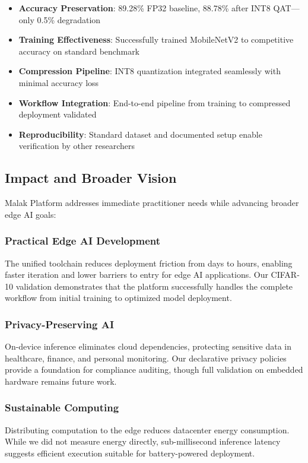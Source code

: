\begin{itemize}
\item \textbf{Accuracy Preservation}: 89.28\% FP32 baseline, 88.78\% after INT8 QAT—only 0.5\% degradation
\item \textbf{Training Effectiveness}: Successfully trained MobileNetV2 to competitive accuracy on standard benchmark
\item \textbf{Compression Pipeline}: INT8 quantization integrated seamlessly with minimal accuracy loss
\item \textbf{Workflow Integration}: End-to-end pipeline from training to compressed deployment validated
\item \textbf{Reproducibility}: Standard dataset and documented setup enable verification by other researchers
\end{itemize}

\subsection{Impact and Broader Vision}

Malak Platform addresses immediate practitioner needs while advancing broader edge AI goals:

\subsubsection{Practical Edge AI Development}
The unified toolchain reduces deployment friction from days to hours, enabling faster iteration and lower barriers to entry for edge AI applications. Our CIFAR-10 validation demonstrates that the platform successfully handles the complete workflow from initial training to optimized model deployment.

\subsubsection{Privacy-Preserving AI}
On-device inference eliminates cloud dependencies, protecting sensitive data in healthcare, finance, and personal monitoring. Our declarative privacy policies provide a foundation for compliance auditing, though full validation on embedded hardware remains future work.

\subsubsection{Sustainable Computing}
Distributing computation to the edge reduces datacenter energy consumption. While we did not measure energy directly, sub-millisecond inference latency suggests efficient execution suitable for battery-powered deployment.

